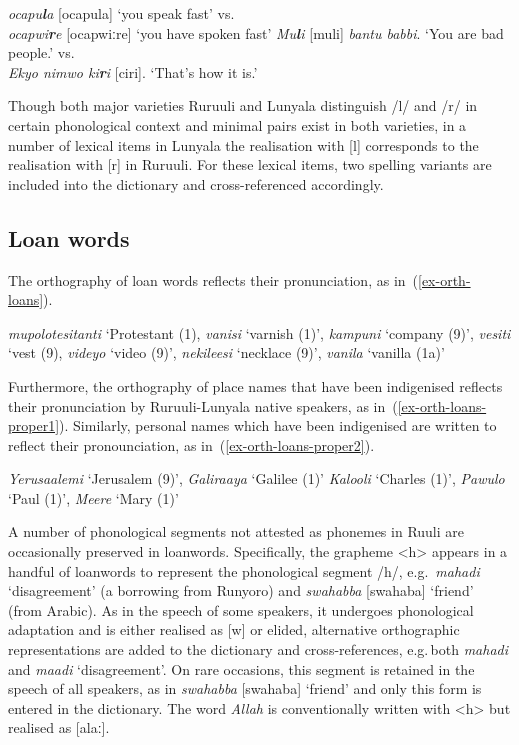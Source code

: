 \ea \label{ex-orth-rtol}
\begin{xlist}
\ex  \textit{ocapu\textbf{l}a} [ocapula] `you speak fast' vs.\\ \textit{ocapwi\textbf{r}e} [ocapwiːre] `you have spoken fast'
\ex  \textit{Mu\textbf{l}i} [muli]  \textit{bantu babbi}. `You are bad people.' vs.\\ 	
 \textit{Ekyo nimwo ki\textbf{r}i} [ciri]. `That's how it is.'
\end{xlist}
\z

Though both major varieties Ruruuli and Lunyala distinguish /l/ and /r/ in certain phonological context and minimal pairs exist in both varieties, in a number of lexical items in Lunyala the realisation with [l] corresponds to the realisation with [r] in Ruruuli. 
For these lexical items, two spelling variants are included into the dictionary and cross-referenced accordingly.


\subsection{Loan words} \label{sec-orthography-loans}
The orthography of loan words reflects their pronunciation, as in~(\ref{ex-orth-loans}).

\ea \label{ex-orth-loans}
 \textit{mupolotesitanti} `Protestant (1),  \textit{vanisi} `varnish (1)',  \textit{kampuni} `company (9)',   \textit{vesiti} `vest (9),  \textit{videyo} `video (9)',  \textit{nekileesi} `necklace (9)',  \textit{vanila} `vanilla (1a)'
\z

\noindent Furthermore, the orthography of place names that have been indigenised reflects their pronunciation by Ruruuli-Lunyala native speakers, as in~(\ref{ex-orth-loans-proper1}). 
Similarly, personal names which have been indigenised are written to reflect their pronounciation, as in~(\ref{ex-orth-loans-proper2}).

\ea \label{ex-orth-loans-proper}
\begin{xlist}
\ex  \textit{Yerusaalemi} `Jerusalem (9)',  \textit{Galiraaya} `Galilee (1)' \label{ex-orth-loans-proper1}
\ex  \textit{Kalooli} `Charles (1)',  \textit{Pawulo} `Paul (1)',  \textit{Meere} `Mary (1)'\label{ex-orth-loans-proper2}
\end{xlist}
\z

A number of phonological segments not attested as phonemes in Ruuli are occasionally preserved in loanwords. 
Specifically, the grapheme <h> appears in a handful of loanwords to represent the phonological segment /h/, e.g.\, \textit{mahadi}  ‘disagreement’ (a borrowing from Runyoro) and  \textit{swahabba} [swahaba] `friend' (from Arabic). 
As in the speech of some speakers, it undergoes phonological adaptation and is either realised as [w] or elided, alternative orthographic representations are added to the dictionary and cross-references, e.g.\,both  \textit{mahadi} and  \textit{maadi} ‘disagreement’.  
On rare occasions, this segment is retained in the speech of all speakers, as in  \textit{swahabba} [swahaba] `friend' and only this form is entered in the dictionary. 
The word  \textit{Allah} is conventionally written with <h> but realised as [alaː].

